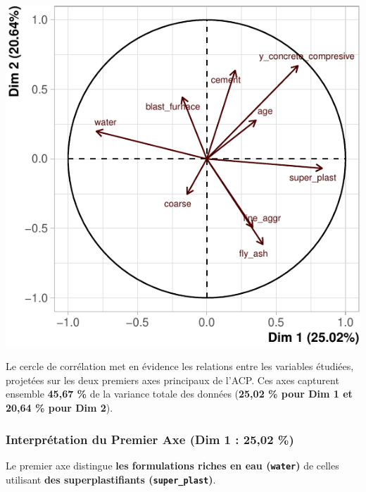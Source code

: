 \documentclass[
  12pt,
]{article}
\begin{document}
\begin{center}\includegraphics{rmd_final_files/figure-latex/unnamed-chunk-31-1} \end{center}

Le cercle de corrélation met en évidence les relations entre les
variables étudiées, projetées sur les deux premiers axes principaux de
l'ACP. Ces axes capturent ensemble \textbf{45,67 \%} de la variance
totale des données (\textbf{25,02 \% pour Dim 1 et 20,64 \% pour Dim
2}).

\subsubsection{Interprétation du Premier Axe (Dim 1 : 25,02
\%)}\label{interpruxe9tation-du-premier-axe-dim-1-2502}

Le premier axe distingue \textbf{les formulations riches en eau
(\texttt{water})} de celles utilisant \textbf{des superplastifiants
(\texttt{super\_plast})}.
\end{document}
